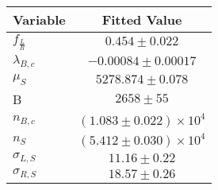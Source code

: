\begin{tabular}[t]{lc}
\hline
Variable &Fitted Value\\
\hline\hline
$f_{\frac{L}{R}}$&$0.454\pm0.022$\\
\hline
$\lambda_{B,c}$&$-0.00084\pm0.00017$\\
\hline
$\mu_S$&$5278.874\pm0.078$\\
\hline
B&$2658\pm55$\\
\hline
$n_{B,c}$&$(1.083\pm0.022)\times 10^4$\\
\hline
$n_S$&$(5.412\pm0.030)\times 10^4$\\
\hline
$\sigma_{L, S}$&$11.16\pm0.22$\\
\hline
$\sigma_{R, S}$&$18.57\pm0.26$\\
\hline
\end{tabular}